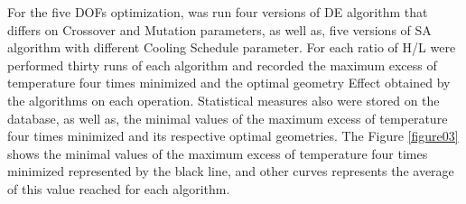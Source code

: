 \documentclass[10pt,fleqn,a4paper,twoside]{article}
\begin{document}
For the five DOFs optimization, was run four versions of DE algorithm that differs on Crossover and Mutation parameters, as well as, five versions of SA algorithm with different Cooling Schedule parameter. For each ratio of H/L were performed thirty runs of each algorithm and recorded the maximum excess of temperature four times minimized and the optimal geometry Effect obtained by the algorithms on each operation. Statistical measures also were stored on the database, as well as, the minimal values of the maximum excess of temperature four times minimized and its respective optimal geometries. The Figure \ref{figure03} shows  the minimal values of the maximum excess of temperature four times minimized represented by the black line, and other curves represents the average of this value reached for each algorithm. 

\end{document}
